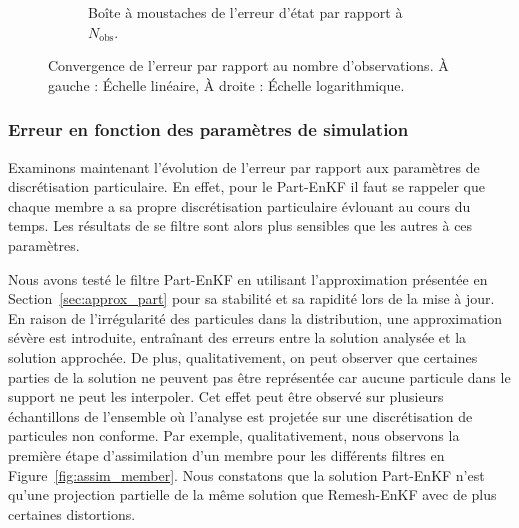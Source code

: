 \begin{figure}[h!]
\begin{subfigure}{0.49\linewidth}
        \caption{Boîte à moustaches de l'erreur d'état par rapport à $N_{\text{obs}}$.}
        \label{fig:nobs_2}
    \end{subfigure}
    \caption{Convergence de l'erreur par rapport au nombre d'observations. À gauche : Échelle linéaire, À droite : Échelle logarithmique.}
    \label{fig:nobs}
\end{figure}

\subsubsection{Erreur en fonction des paramètres de simulation}

Examinons maintenant l'évolution de l'erreur par rapport aux paramètres de discrétisation particulaire. En effet, pour le Part-EnKF il faut se rappeler que chaque membre a sa propre discrétisation particulaire évlouant au cours du temps. Les résultats de se filtre sont alors plus sensibles que les autres à ces paramètres.

Nous avons testé le filtre Part-EnKF en utilisant l'approximation présentée en Section~\ref{sec:approx_part} pour sa stabilité et sa rapidité lors de la mise à jour. En raison de l'irrégularité des particules dans la distribution, une approximation sévère est introduite, entraînant des erreurs entre la solution analysée et la solution approchée. De plus, qualitativement, on peut observer que certaines parties de la solution ne peuvent pas être représentée car aucune particule dans le support ne peut les interpoler. Cet effet peut être observé sur plusieurs échantillons de l'ensemble où l'analyse est projetée sur une discrétisation de particules non conforme.
Par exemple, qualitativement, nous observons la première étape d'assimilation d'un membre pour les différents filtres en Figure~\ref{fig:assim_member}. Nous constatons que la solution Part-EnKF n'est qu'une projection partielle de la même solution que Remesh-EnKF avec de plus certaines distortions.

